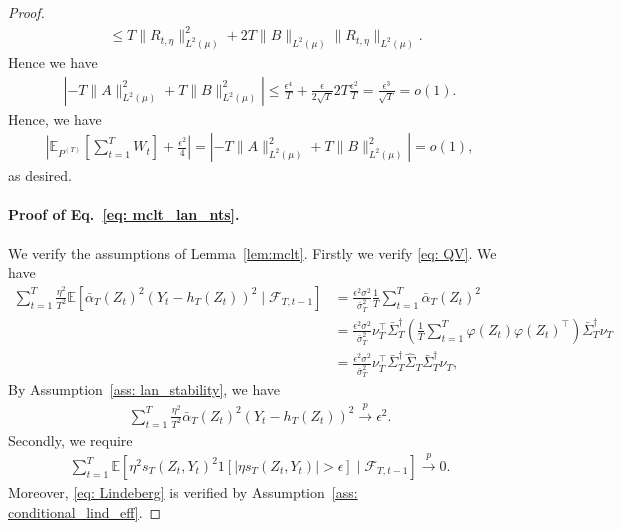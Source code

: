 \documentclass[11pt]{article}
\begin{document}
\begin{proof}
\begin{align*}
        &\leq T\|R_{t, \eta}\|^2_{L^2(\mu)} + 2T\|B\|_{L^2(\mu)}\|R_{t,\eta}\|_{L^2(\mu)}.
    \end{align*}
    Hence we have
    \begin{align*}
        \left|-T \|A\|^2_{L^2(\mu)} + T\|B\|^2_{L^2(\mu)}\right| \leq \frac{\epsilon^4}{T} + \frac{\epsilon}{2\sqrt{T}}2T\frac{\epsilon^2}{T} = \frac{\epsilon^3}{\sqrt{T}} = o(1). 
    \end{align*}
    Hence, we have
    \begin{align*}
        \left|\mathbb{E}_{P^{(T)}}\left[\sum_{t=1}^{T}W_t\right] + \frac{\epsilon^2}{4}\right| = \left|-T\|A\|^2_{L^2(\mu)} + T\|B\|^2_{L^2(\mu)}\right| = o(1),
    \end{align*}
    as desired. 
    

    \paragraph{Proof of Eq.~\eqref{eq: mclt_lan_nts}.} We verify the assumptions of Lemma~\ref{lem:mclt}. Firstly we verify \eqref{eq: QV}. We have
    \begin{align*}
        \sum_{t=1}^{T}\frac{\eta^2}{T^2}\mathbb{E}\left[\bar{\alpha}_T(Z_t)^2(Y_t - h_T(Z_t))^2\mid \mathcal{F}_{T,t-1}\right] &= \frac{\epsilon^2\sigma^2}{\bar{\sigma}_T^2}\frac{1}{T}\sum_{t=1}^{T}\bar{\alpha}_T(Z_t)^2\\
        &= \frac{\epsilon^2\sigma^2}{\bar{\sigma}_T^2}\nu_T^{\top}\bar{\Sigma}_T^{\dag}\left(\frac{1}{T}\sum_{t=1}^{T}\varphi(Z_t)\varphi(Z_t)^{\top}\right)\bar{\Sigma}_T^{\dag}\nu_T\\
        &= \frac{\epsilon^2\sigma^2}{\bar{\sigma}_T^2}\nu_T^{\top}\bar{\Sigma}_T^{\dag}\hat{\Sigma}_T\bar{\Sigma}_T^{\dag}\nu_T,
    \end{align*}
    By Assumption~\ref{ass: lan_stability}, we have
    \begin{align}
    \label{eq: qv_epsilon_sq}
        \sum_{t=1}^{T}\frac{\eta^2}{T^2}\bar{\alpha}_T(Z_t)^2(Y_t - h_T(Z_t))^2 \overset{p}{\rightarrow}\epsilon^2.
    \end{align}
    Secondly, we require
    \begin{align*}
        \sum_{t=1}^{T}\mathbb{E}\left[\eta^2 s_T(Z_t, Y_t)^2 1[|\eta s_T(Z_t, Y_t)| > \epsilon]\mid \mathcal{F}_{T,t-1}\right] \overset{p}{\rightarrow} 0.
    \end{align*}
    Moreover, \eqref{eq: Lindeberg} is verified by Assumption~\ref{ass: conditional_lind_eff}. 
    

\end{proof}
\end{document}
